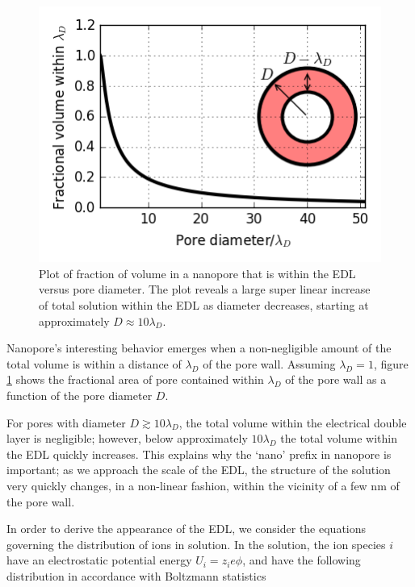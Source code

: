 			
			\begin{figure}
				\includegraphics{fractioninsideedl.png}
				\caption{Plot of fraction of volume in a nanopore that is within the EDL versus pore diameter. The plot reveals a large super linear increase of total solution within the EDL as diameter decreases, starting at approximately $D\approx 10\lambda_{D}$.}
				
				\label{fig:fractioninsideedl}
			\end{figure}
			
			Nanopore's interesting behavior emerges when a non-negligible amount of the total volume is within a distance of $\lambda_{D}$ of the pore wall. Assuming $\lambda_{D}=1$, figure \ref{fig:fractioninsideedl} shows the fractional area of pore contained within $\lambda_{D}$ of the pore wall as a function of the pore diameter $D$. 
			
			
			
			For pores with diameter $D\gtrsim10\lambda_{D}$, the total volume within the electrical double layer is negligible; however, below approximately $10\lambda_{D}$ the total volume within the EDL quickly increases. This explains why the `nano' prefix in nanopore is important; as we approach the scale of the EDL, the structure of the solution very quickly changes, in a non-linear fashion, within the vicinity of a few nm of the pore wall.
			
			
			
			In order to derive the appearance of the EDL, we consider the equations governing the distribution of ions in solution. In the solution, the ion species $i$ have an electrostatic potential energy $U_{i}=z_{i}e\phi$, and have the following distribution in accordance with Boltzmann statistics
			
